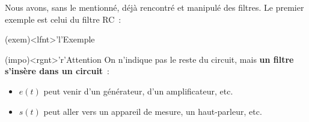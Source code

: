 \documentclass[../../main/main.tex]{subfiles}
\begin{document}
Nous avons, sans le mentionné, déjà rencontré et manipulé des filtres. Le premier
exemple est celui du filtre RC~:
\begin{tcbraster}[raster columns=2, raster equal height=rows]
	\begin{tcb}(exem)<lfnt>'l'{Exemple}
		\begin{minipage}{\linewidth}
			\vspace{-15pt}
		\end{minipage}
	\end{tcb}
	\begin{tcb}(impo)<rgnt>'r'{Attention}
		On n'indique pas le reste du circuit, mais \textbf{un filtre s'insère
			dans un circuit}~:
		\begin{itemize}
			\item $e(t)$ peut venir d'un générateur, d'un amplificateur, etc.
			\item $s(t)$ peut aller vers un appareil de mesure, un haut-parleur,
			      etc.
		\end{itemize}
	\end{tcb}
\end{tcbraster}
\end{document}
